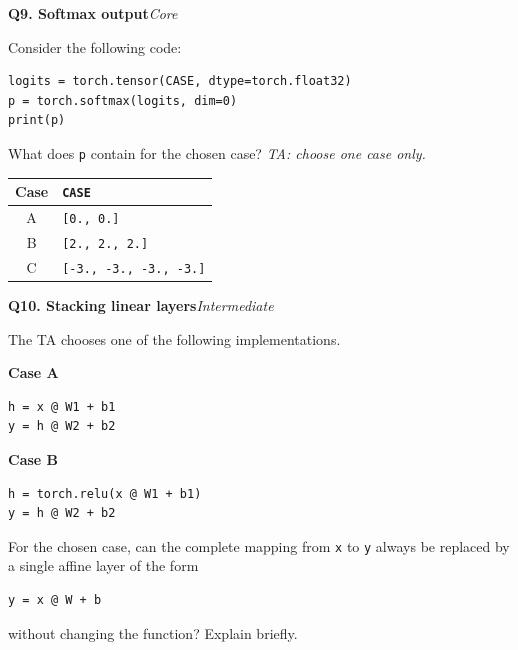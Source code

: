 \documentclass[11pt]{article}
\newif\ifshowanswers
\newenvironment{question}[3]{%
  \par\medskip
  \noindent\textbf{Q#1. #2}\hfill\textit{#3}\par\smallskip
}{\par\medskip}
\newcommand{\answer}[1]{%
  \ifshowanswers
    \begin{quote}\small\textbf{Expected answer:} #1\end{quote}
  \fi
}
\newcommand{\marking}[1]{%
  \ifshowanswers
    \begin{quote}\small\textbf{1 mark:} #1\end{quote}
  \fi
}
\newcommand{\casesnote}{\textit{TA: choose one case only.}}
\begin{document}
\begin{question}{9}{Softmax output}{Core}
Consider the following code:

\begin{verbatim}
logits = torch.tensor(CASE, dtype=torch.float32)
p = torch.softmax(logits, dim=0)
print(p)
\end{verbatim}

What does \texttt{p} contain for the chosen case? \casesnote

\begin{center}
\begin{tabular}{cl}
\toprule
Case & \texttt{CASE} \\
\midrule
A & \texttt{[0., 0.]} \\
B & \texttt{[2., 2., 2.]} \\
C & \texttt{[-3., -3., -3., -3.]} \\
\bottomrule
\end{tabular}
\end{center}

\answer{
A: approximately \texttt{[0.5, 0.5]}. \\
B: approximately \texttt{[0.333, 0.333, 0.333]}. \\
C: approximately \texttt{[0.25, 0.25, 0.25, 0.25]}. \\
When all logits are equal, softmax assigns equal probability to every class.
}
\marking{Correct output for the chosen case.}
\end{question}

\begin{question}{10}{Stacking linear layers}{Intermediate}
The TA chooses one of the following implementations.

\textbf{Case A}
\begin{verbatim}
h = x @ W1 + b1
y = h @ W2 + b2
\end{verbatim}

\textbf{Case B}
\begin{verbatim}
h = torch.relu(x @ W1 + b1)
y = h @ W2 + b2
\end{verbatim}

For the chosen case, can the complete mapping from \texttt{x} to \texttt{y}
always be replaced by a single affine layer of the form

\begin{verbatim}
y = x @ W + b
\end{verbatim}

without changing the function? Explain briefly.

\answer{
Case A: Yes. The two affine transformations can be combined into one affine
transformation.

Case B: No, in general. ReLU introduces a nonlinear operation between the
layers, so the overall function cannot generally be collapsed into one affine
layer.
}
\marking{Correct yes/no answer for the chosen case and identifies the presence
or absence of the nonlinear activation as the reason.}
\end{question}
\end{document}
